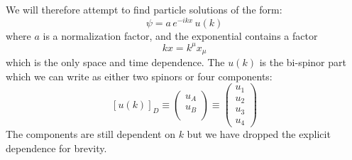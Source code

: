 \documentclass[12pt]{article}
\begin{document}
We will therefore attempt to find particle solutions of the form:
$$\psi = a \, e^{-ikx} \, u(k)$$
where $a$ is a normalization factor, and the exponential contains a factor
$$kx = k^\mu x_\mu$$
which is the only space and time dependence.  The $u(k)$ is the bi-spinor part which we can write as either two spinors or four components:
$$[u(k)]_D \equiv \begin{pmatrix} u_A \\ u_B \\ \end{pmatrix} \equiv
\begin{pmatrix} u_1 \\ u_2\\ u_3 \\ u_4 \end{pmatrix}
$$
The components are still dependent on $k$ but we have dropped the explicit dependence for brevity.
\end{document}
